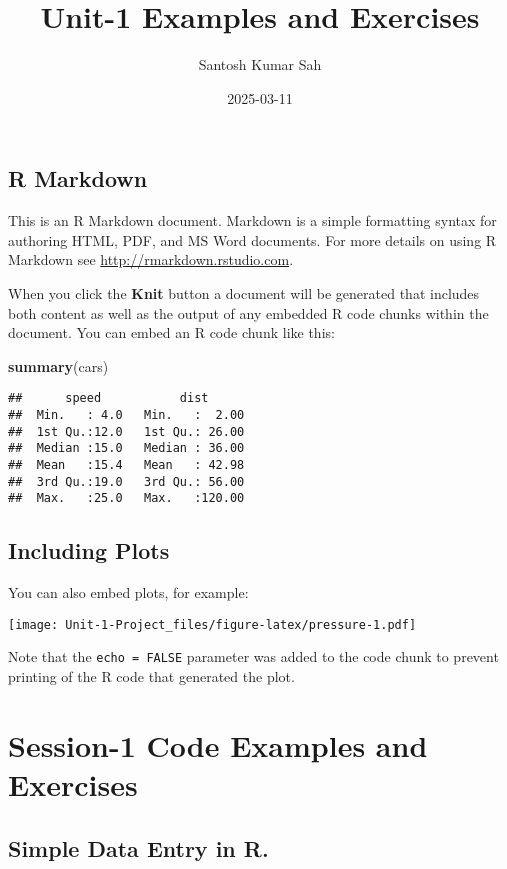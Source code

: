 \documentclass[
]{article}
\title{Unit-1 Examples and Exercises}
\author{Santosh Kumar Sah}
\date{2025-03-11}
\newenvironment{Shaded}{\begin{snugshade}}{\end{snugshade}}
\newcommand{\FunctionTok}[1]{\textcolor[rgb]{0.13,0.29,0.53}{\textbf{#1}}}
\newcommand{\NormalTok}[1]{#1}
\begin{document}
\maketitle

\subsection{R Markdown}\label{r-markdown}

This is an R Markdown document. Markdown is a simple formatting syntax
for authoring HTML, PDF, and MS Word documents. For more details on
using R Markdown see \url{http://rmarkdown.rstudio.com}.

When you click the \textbf{Knit} button a document will be generated
that includes both content as well as the output of any embedded R code
chunks within the document. You can embed an R code chunk like this:

\begin{Shaded}
\begin{Highlighting}[]
\FunctionTok{summary}\NormalTok{(cars)}
\end{Highlighting}
\end{Shaded}

\begin{verbatim}
##      speed           dist       
##  Min.   : 4.0   Min.   :  2.00  
##  1st Qu.:12.0   1st Qu.: 26.00  
##  Median :15.0   Median : 36.00  
##  Mean   :15.4   Mean   : 42.98  
##  3rd Qu.:19.0   3rd Qu.: 56.00  
##  Max.   :25.0   Max.   :120.00
\end{verbatim}

\subsection{Including Plots}\label{including-plots}

You can also embed plots, for example:

\texttt{[image: Unit-1-Project\_files/figure-latex/pressure-1.pdf]}

Note that the \texttt{echo\ =\ FALSE} parameter was added to the code
chunk to prevent printing of the R code that generated the plot.

\section{Session-1 Code Examples and
Exercises}\label{session-1-code-examples-and-exercises}

\subsection{Simple Data Entry in R.}\label{simple-data-entry-in-r.}
\end{document}
